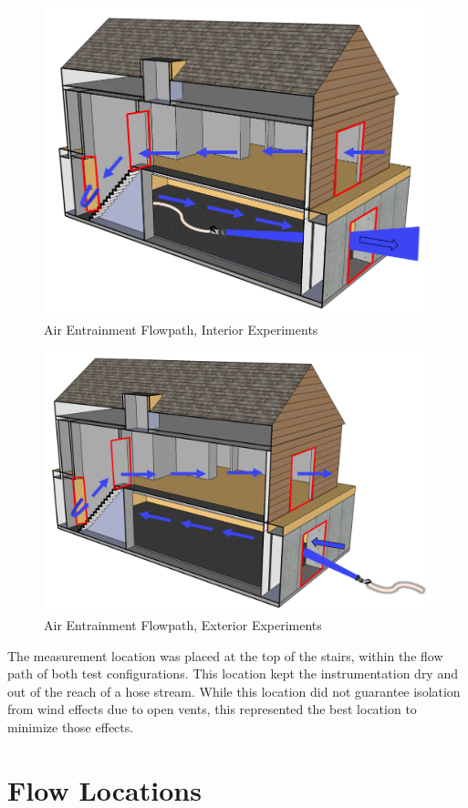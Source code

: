 \documentclass[12pt,oneside]{book}
\begin{document}
\begin{figure}[!ht]
	\centering
	\includegraphics[width=.7\columnwidth]{Figures/Air_Entrainment/Airflow_Layout}
	\caption{Air Entrainment Flowpath, Interior Experiments}
	\label{fig:Air_Entrainment_Flowpath_Interior_Experiments}
\end{figure}

\begin{figure}[!ht]
	\centering
	\includegraphics[width=.7\columnwidth]{Figures/Air_Entrainment/Airflow_Layout_Ext}
	\caption{Air Entrainment Flowpath, Exterior Experiments}
	\label{fig:Air_Entrainment_Flowpath_Exterior_Experiments}
\end{figure}

The measurement location was placed at the top of the stairs, within the flow path of both test configurations. This location kept the instrumentation dry and out of the reach of a hose stream. While this location did not guarantee isolation from wind effects due to open vents, this represented the best location to minimize those effects.

\clearpage

\section{Flow Locations}
\end{document}
